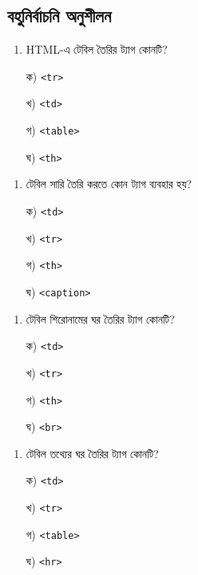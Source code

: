 \subsection{বহুনির্বাচনি অনুশীলন}

\par\addvspace{4pt}\noindent
\begin{minipage}[t]{.48\linewidth}\vspace{0pt}
\begin{enumerate}[start=1,leftmargin=*,topsep=0pt,itemsep=0pt]
\item HTML-এ টেবিল তৈরির ট্যাগ কোনটি?
\par ক) \texttt{<tr>}
\par খ) \texttt{<td>}
\par গ) \texttt{<table>}
\par ঘ) \texttt{<th>}
\end{enumerate}
\end{minipage}\hfill
\begin{minipage}[t]{.48\linewidth}\vspace{0pt}
\begin{enumerate}[start=2,leftmargin=*,topsep=0pt,itemsep=0pt]
\item টেবিল সারি তৈরি করতে কোন ট্যাগ ব্যবহার হয়?
\par ক) \texttt{<td>}
\par খ) \texttt{<tr>}
\par গ) \texttt{<th>}
\par ঘ) \texttt{<caption>}
\end{enumerate}
\end{minipage}
\par
\par\addvspace{4pt}\noindent
\begin{minipage}[t]{.48\linewidth}\vspace{0pt}
\begin{enumerate}[start=3,leftmargin=*,topsep=0pt,itemsep=0pt]
\item টেবিল শিরোনামের ঘর তৈরির ট্যাগ কোনটি?
\par ক) \texttt{<td>}
\par খ) \texttt{<tr>}
\par গ) \texttt{<th>}
\par ঘ) \texttt{<br>}
\end{enumerate}
\end{minipage}\hfill
\begin{minipage}[t]{.48\linewidth}\vspace{0pt}
\begin{enumerate}[start=4,leftmargin=*,topsep=0pt,itemsep=0pt]
\item টেবিল তথ্যের ঘর তৈরির ট্যাগ কোনটি?
\par ক) \texttt{<td>}
\par খ) \texttt{<tr>}
\par গ) \texttt{<table>}
\par ঘ) \texttt{<hr>}
\end{enumerate}
\end{minipage}
